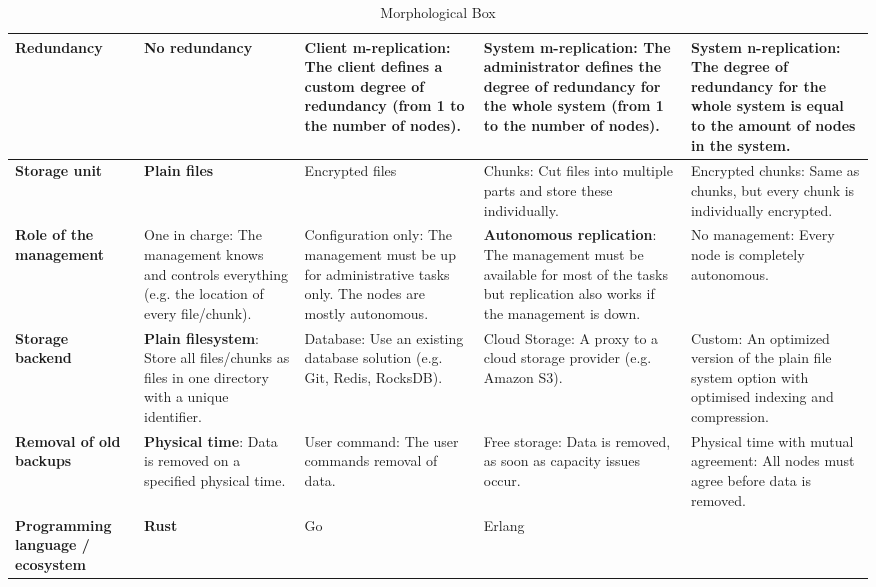 \begin{table}
	\centering
	\caption[Morphological Box]{Morphological Box}
	\label{tbl:morphological-box}
    \begin{tabu}{X | X X X X}
		\hline
          \textbf{Redundancy}
          & No redundancy
          & Client m-replication: The \gls{client} defines a custom degree of redundancy (from 1 to the number of \glspl{node}).
          & System m-replication: The administrator defines the degree of redundancy for the whole system (from 1 to the number of \glspl{node}).
          & \textbf{System n-replication}: The degree of redundancy for the whole system is equal to the amount of \glspl{node} in the system.
          \\ \hline

          \textbf{Storage unit}
          & \textbf{Plain files}
          & Encrypted files
          & Chunks: Cut files into multiple parts and store these individually.
          & Encrypted chunks: Same as chunks, but every chunk is individually encrypted.
          \\ \hline


          \textbf{Role of the management}
          & One in charge: The management knows and controls everything (e.g. the location of every file/chunk).
          & Configuration only: The management must be up for administrative tasks only. The \glspl{node} are mostly autonomous.
          & \textbf{Autonomous replication}: The management must be available for most of the tasks but replication also works if the management is down.
          & No management: Every \gls{node} is completely autonomous.
          \\ \hline


          \textbf{Storage backend}
          & \textbf{Plain filesystem}: Store all files/chunks as files in one directory with a unique identifier.
          & Database: Use an existing database solution (e.g. Git, Redis, RocksDB).
          & Cloud Storage: A proxy to a cloud storage provider (e.g. Amazon S3).
          & Custom: An optimized version of the plain file system option with optimised indexing and compression.
          \\ \hline


          \textbf{Removal of old backups}
          & \textbf{Physical time}: Data is removed on a specified physical time.
          & User command: The user commands removal of data.
          & Free storage: Data is removed, as soon as capacity issues occur.
          & Physical time with mutual agreement: All \glspl{node} must agree before data is removed.
          \\ \hline


          \textbf{Programming language / ecosystem}
          & \textbf{Rust}
          & Go
          & Erlang
          & 
          \\ \hline
	\end{tabu}
\end{table}

